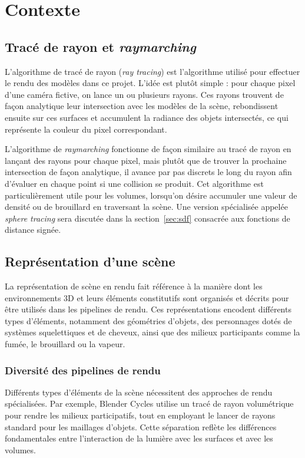 \section{Contexte}
\label{sec:contexte}

\subsection{Tracé de rayon et \textit{raymarching}}
\label{sec:ray-tracing-raymarching}

L'algorithme de tracé de rayon (\textit{ray tracing}) est l'algorithme utilisé pour effectuer le rendu des modèles dans ce projet. L'idée est plutôt simple : pour chaque pixel d'une caméra fictive, on lance un ou plusieurs rayons. Ces rayons trouvent de façon analytique leur intersection avec les modèles de la scène, rebondissent ensuite sur ces surfaces et accumulent la radiance des objets intersectés, ce qui représente la couleur du pixel correspondant.

L'algorithme de \textit{raymarching} fonctionne de façon similaire au tracé de rayon en lançant des rayons pour chaque pixel, mais plutôt que de trouver la prochaine intersection de façon analytique, il avance par pas discrets le long du rayon afin d'évaluer en chaque point si une collision se produit. Cet algorithme est particulièrement utile pour les volumes, lorsqu'on désire accumuler une valeur de densité ou de brouillard en traversant la scène. Une version spécialisée appelée \textit{sphere tracing} sera discutée dans la section~\ref{sec:sdf} consacrée aux fonctions de distance signée.

\subsection{Représentation d'une scène}
La représentation de scène en rendu fait référence à la manière dont les environnements 3D et leurs éléments constitutifs sont organisés et décrits pour être utilisés dans les pipelines de rendu. Ces représentations encodent différents types d'éléments, notamment des géométries d'objets, des personnages dotés de systèmes squelettiques et de cheveux, ainsi que des milieux participants comme la fumée, le brouillard ou la vapeur.

\subsubsection{Diversité des pipelines de rendu}

Différents types d'éléments de la scène nécessitent des approches de rendu spécialisées. Par exemple, Blender Cycles utilise un tracé de rayon volumétrique pour rendre les milieux participatifs, tout en employant le lancer de rayons standard pour les maillages d'objets. Cette séparation reflète les différences fondamentales entre l'interaction de la lumière avec les surfaces et avec les volumes.

